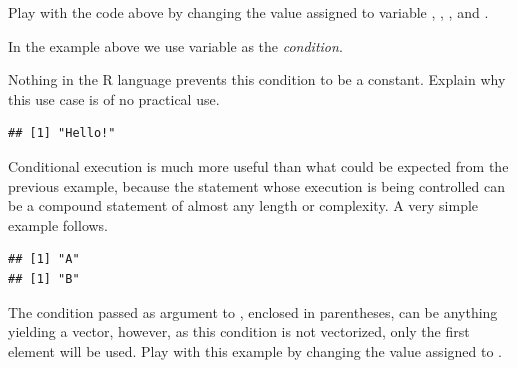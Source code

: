 \documentclass[krantz2]{krantz}\usepackage{knitr}%
\begin{document}
\begin{playground}
Play with the code above by changing the value assigned to variable , , , and .

In the example above we use variable  as the \emph{condition}.

Nothing in the R language prevents this condition to be a  constant. Explain why this use case is of no practical use.

\begin{knitrout}\footnotesize
{}\color{fgcolor}\begin{kframe}
\begin{alltt}
 \hlstd{(}\hlstd{)} \hlstd{(}\hlstd{)}
\end{alltt}
\begin{verbatim}
## [1] "Hello!"
\end{verbatim}
\end{kframe}
\end{knitrout}
\end{playground}

Conditional execution is much more useful than what could be expected from the previous example, because the statement whose execution is being controlled can be a compound statement of almost any length or complexity. A very simple example follows.

\begin{knitrout}\footnotesize
{}\color{fgcolor}\begin{kframe}
\begin{alltt}
 \hlkwb{<-} 
 
  \hlstd{(}\hlstd{)}
  \hlstd{(}\hlstd{)}
\hlstd{\}}
\end{alltt}
\begin{verbatim}
## [1] "A"
## [1] "B"
\end{verbatim}
\end{kframe}
\end{knitrout}

The condition passed as argument to , enclosed in parentheses, can be anything yielding a  vector, however, as this condition is not vectorized, only the first element will be used. Play with this example by changing the value assigned to .
\end{document}
